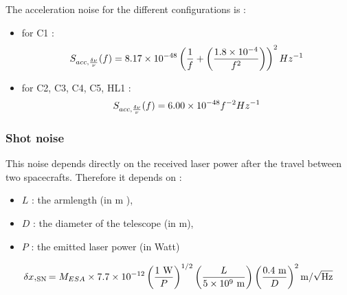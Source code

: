 \documentclass{iopart}
\begin{document}
The acceleration noise for the different configurations is :
\begin{itemize}
\item for C1 : 
\begin{equation}
S_{acc, {\delta \nu \over \nu}} (f)  =  8.17 \times 10^{-48} \left( { 1 \over f} + \left({1.8 \times 10^{-4} \over f ^2} \right) \right)^2 Hz^{-1}
\end{equation}
\item for C2, C3, C4, C5, HL1 :
\begin{equation}
S_{acc, {\delta \nu \over \nu}} (f)  =  6.00 \times 10^{-48} f^{-2} Hz^{-1}
\end{equation}
\end{itemize}
 






\subsubsection{Shot noise}
\label{SSS:Inst:Noises:Shot}

This noise depends directly on the received laser power after the travel between two spacecrafts. Therefore it depends on :
\begin{itemize}
\item $L$ : the armlength (in m ),
\item $D$ : the diameter of the telescope (in m),
\item $P$ : the emitted laser power (in Watt) 
\end{itemize}
 

\begin{equation}
\delta x,_{\textrm{SN}} = M_{ESA} \times  7.7 \times 10^{-12}  \left( {1 \ \textrm{W} \over P } \right)^{1/2} \left( { L \over 5 \times 10^9 \ \textrm{m}} \right) \left( {0.4 \ \textrm{m} \over D }\right)^2  \textrm{m}/\sqrt{\textrm{Hz}} 
\end{equation}
\end{document}
